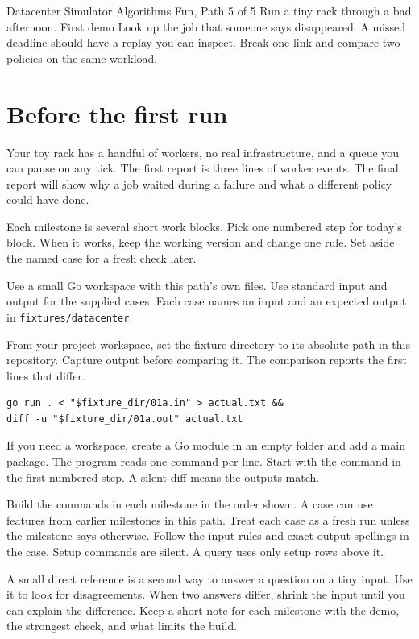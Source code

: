 \documentclass[11pt,letterpaper]{article}
\begin{document}
\coursecover
  {Datacenter Simulator}
  {Algorithms Fun, Path 5 of 5}
  {Run a tiny rack through a bad afternoon.}
  {First demo}
  {Look up the job that someone says disappeared.}
  {A missed deadline should have a replay you can inspect.}
  {Break one link and compare two policies on the same workload.}
\tableofcontents
\clearpage
\section{Before the first run}
Your toy rack has a handful of workers, no real infrastructure, and a queue you can pause on any tick. The first report is three lines of worker events. The final report will show why a job waited during a failure and what a different policy could have done.

Each milestone is several short work blocks. Pick one numbered step for today's block. When it works, keep the working version and change one rule. Set aside the named case for a fresh check later.

Use a small Go workspace with this path's own files. Use standard input and output for the supplied cases. Each case names an input and an expected output in \texttt{fixtures/datacenter}.

From your project workspace, set the fixture directory to its absolute path in this repository. Capture output before comparing it. The comparison reports the first lines that differ.
\begin{samepage}
\small
\begin{verbatim}
go run . < "$fixture_dir/01a.in" > actual.txt &&
diff -u "$fixture_dir/01a.out" actual.txt
\end{verbatim}
\end{samepage}

If you need a workspace, create a Go module in an empty folder and add a main package. The program reads one command per line. Start with the command in the first numbered step. A silent diff means the outputs match.

Build the commands in each milestone in the order shown. A case can use features from earlier milestones in this path. Treat each case as a fresh run unless the milestone says otherwise. Follow the input rules and exact output spellings in the case. Setup commands are silent. A query uses only setup rows above it.

A small direct reference is a second way to answer a question on a tiny input. Use it to look for disagreements. When two answers differ, shrink the input until you can explain the difference. Keep a short note for each milestone with the demo, the strongest check, and what limits the build.
\end{document}
